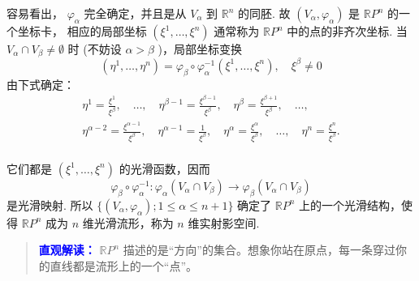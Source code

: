 容易看出， $\varphi_{\alpha}$  完全确定，并且是从  $V_{\alpha}$  到  $\mathbb{R}^{n}$  的同胚. 故  $(V_{\alpha}, \varphi_{\alpha})$  是  $\mathbb{R}P^{n}$  的一个坐标卡， 相应的局部坐标  $(\xi^{1}, \dots, \xi^{n})$  通常称为  $\mathbb{R}P^{n}$  中的点的非齐次坐标. 当  $V_{\alpha} \cap V_{\beta} \neq \emptyset$  时 (不妨设  $\alpha > \beta$ )，局部坐标变换
$$
(\eta^ {1}, \dots , \eta^ {n}) = \varphi_ {\beta} \circ \varphi_ {\alpha} ^ {- 1} (\xi^ {1}, \dots , \xi^ {n}), \quad \xi^ {\beta} \neq 0
$$
由下式确定：
$$
\begin{array}{l} \eta^ {1} = \frac {\xi^ {1}}{\xi^ {\beta}}, \quad \dots , \quad \eta^ {\beta - 1} = \frac {\xi^ {\beta - 1}}{\xi^ {\beta}}, \quad \eta^ {\beta} = \frac {\xi^ {\beta + 1}}{\xi^ {\beta}}, \quad \dots , \\ \eta^ {\alpha - 2} = \frac {\xi^ {\alpha - 1}}{\xi^ {\beta}}, \quad \eta^ {\alpha - 1} = \frac {1}{\xi^ {\beta}}, \quad \eta^ {\alpha} = \frac {\xi^ {\alpha}}{\xi^ {\beta}}, \quad \dots , \quad \eta^ {n} = \frac {\xi^ {n}}{\xi^ {\beta}}. \\ \end{array}
$$

它们都是  $(\xi^{1},\dots ,\xi^{n})$  的光滑函数，因而
$$
\varphi_ {\beta} \circ \varphi_ {\alpha} ^ {- 1}: \varphi_ {\alpha} (V _ {\alpha} \cap V _ {\beta}) \rightarrow \varphi_ {\beta} (V _ {\alpha} \cap V _ {\beta})
$$
是光滑映射. 所以  $\{(V_{\alpha}, \varphi_{\alpha}); 1 \leqslant \alpha \leqslant n + 1\}$  确定了  $\mathbb{R}P^{n}$  上的一个光滑结构，使得  $\mathbb{R}P^{n}$  成为  $n$  维光滑流形，称为  $n$  维实射影空间.

\begin{quote}
\textbf{\textcolor{blue}{直观解读：}}
$\mathbb{R}P^n$ 描述的是“方向”的集合。想象你站在原点，每一条穿过你的直线都是流形上的一个“点”。
\end{quote}

\endinput
\begin{example}[实射影空间 $\R P^n$]
    $\R P^n$ 是 $\R^{n+1} \setminus \{0\}$ 关于等价关系 $x \sim \lambda x$ ($\lambda \ne 0$) 的商空间。其上的齐次坐标记为 $[x^1 : \dots : x^{n+1}]$。定义开集 $V_\alpha = \{[x] \mid x^\alpha \ne 0\}$ 及坐标映射：
    \[ \varphi_\alpha([x]) = \left( \frac{x^1}{x^\alpha}, \dots, \widehat{\frac{x^\alpha}{x^\alpha}}, \dots, \frac{x^{n+1}}{x^\alpha} \right) \in \R^n \]
    这构成 $\R P^n$ 的一个光滑结构。
\end{example}

\section{光滑映射}

